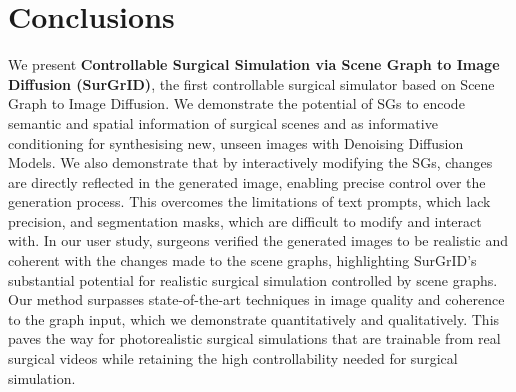 \section{Conclusions}
\label{sec:concl}
We present \textbf{Controllable Surgical Simulation via Scene Graph to Image Diffusion (SurGrID)}, the first controllable surgical simulator based on Scene Graph to Image Diffusion. We demonstrate the potential of SGs to encode semantic and spatial information of surgical scenes and as informative conditioning for synthesising new, unseen images with Denoising Diffusion Models. We also demonstrate that by interactively modifying the SGs, changes are directly reflected in the generated image, enabling precise control over the generation process. This overcomes the limitations of text prompts, which lack precision, and segmentation masks, which are difficult to modify and interact with. In our user study, surgeons verified the generated images to be realistic and coherent with the changes made to the scene graphs, highlighting SurGrID's substantial potential for realistic surgical simulation controlled by scene graphs. Our method surpasses state-of-the-art techniques in image quality and coherence to the graph input, which we demonstrate quantitatively and qualitatively. This paves the way for photorealistic surgical simulations that are trainable from real surgical videos while retaining the high controllability needed for surgical simulation. 